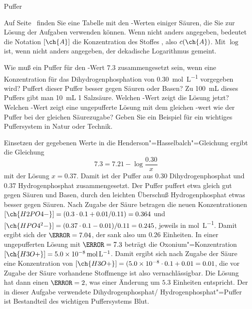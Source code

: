 \documentclass[DIV11]{scrartcl}
\begin{document}
\begin{center}
  \Huge\sffamily Puffer
\end{center}

Auf Seite~\pageref{tab:pKs-werte} finden Sie eine Tabelle mit den \pKa-Werten
einiger Säuren, die Sie zur Lösung der Aufgaben verwenden können.  Wenn nicht
anders angegeben, bedeutet die Notation $[\ch{A}]$ die Konzentration des
Stoffes , also $c(\ch{A})$.  Mit $\log$ ist, wenn nicht anders
angegeben, der dekadische Logarithmus gemeint.

\bigskip

\begin{question}
\begin{tasks}
  \task Wie muß ein Puffer für den \pH-Wert $7.3$ zusammengesetzt sein, wenn
    eine Konzentration für das Dihydrogenphosphation von
    \SI{0.30}{\mole\per\liter} vorgegeben wird? 
  \task Puffert dieser Puffer besser gegen Säuren oder Basen?
  \task Zu \SI{100}{\milli\liter} dieses Puffers gibt man
   \SI{10}{\milli\liter} \SI{1}{\Molar}  Salzsäure. Welchen \pH-Wert zeigt die
   Lösung jetzt?
  \task Welchen \pH-Wert zeigt eine ungepufferte Lösung mit dem gleichen
    \pH-wert wie der Puffer bei der gleichen Säurezugabe?
  \task Geben Sie ein Beispiel für ein wichtiges Puffersystem in Natur oder
    Technik. 
\end{tasks}
\end{question}
\begin{solution}
  \begin{tasks}
    \task Einsetzen der gegebenen Werte in die
      Henderson"=Hasselbalch"=Gleichung ergibt die Gleichung
      \[ 7.3 = 7.21 - \log \frac{0.30}{x} \]
      mit der Lösung $x=0.37$.  Damit ist der Puffer aus \SI{0.30}{\Molar}
      Dihydrogenphosphat und \SI{0.37}{\Molar} Hydrogenphosphat
      zusammengesetzt.
    \task Der Puffer puffert etwa gleich gut gegen Säuren und Basen, durch den
      leichten Überschuß Hydrogenphosphat etwas besser gegen Säuren.
    \task Nach Zugabe der Säure betragen die neuen Konzentrationen
      $[\ch{H2PO4-}] = (0.3\cdot0.1+0.01/0.11) = 0.364$ und $[\ch{HPO4^2-}] =
      (0.37\cdot0.1-0.01)/0.11 = 0.245$, jeweils in \si{\mole\per\liter}.
      Damit ergibt sich der $\pH = 7.04$, der \pH{} sank also um $0.26$
      Einheiten.
    \task In einer ungepufferten Lösung mit $\pH = 7.3$ beträgt die
      Oxonium"=Konzentration $[\ch{H3O+}] = \SI{5.0e-8}{\mole\per\liter}$.
      Damit ergibt sich nach Zugabe der Säure eine Konzentration von
      $[\ch{H3O+}] = (\num{5.0e-8}\cdot0.1+0.01=0.01$, die vor Zugabe der
      Säure vorhandene Stoffmenge ist also vernachlässigbar.  Die Lösung hat
      dann einen $\pH = 2$, was einer Änderung um $5.3$ Einheiten entspricht.
    \task Der in dieser Aufgabe verwendete Dihydrogenphosphat\slash
      Hydrogenphosphat"=Puffer ist Bestandteil des wichtigen Puffersystems
      Blut.
  \end{tasks}
\end{solution}
\end{document}
